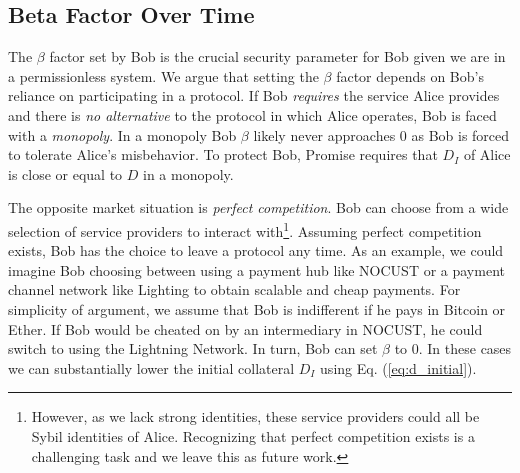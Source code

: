 \documentclass[runningheads]{llncs}
\newcommand{\sys}{Promise\xspace}
\newcommand{\aza}[1]{\todo[linecolor=blue,backgroundcolor=blue!25,bordercolor=blue,inline,caption={}]{Comment by Alexei: #1}}
\begin{document}
\subsection{Beta Factor Over Time}
The $\beta$ factor set by Bob is the crucial security parameter for Bob given we are in a permissionless system.
We argue that setting the $\beta$ factor depends on Bob's reliance on participating in a protocol.
If Bob \emph{requires} the service Alice provides and there is \emph{no alternative} to the protocol in which Alice operates, Bob is faced with a \emph{monopoly}.
In a monopoly Bob $\beta$ likely never approaches 0 as Bob is forced to tolerate Alice's misbehavior.
To protect Bob, \sys requires that $D_I$ of Alice is close or equal to $D$ in a monopoly.

The opposite market situation is \emph{perfect competition}.
Bob can choose from a wide selection of service providers to interact with\footnote{
However, as we lack strong identities, these service providers could all be Sybil identities of Alice.
Recognizing that perfect competition exists is a challenging task and we leave this as future work.}.
Assuming perfect competition exists, Bob has the choice to leave a protocol any time.
As an example, we could imagine Bob choosing between using a payment hub like NOCUST or a payment channel network like Lighting to obtain scalable and cheap payments.
For simplicity of argument, we assume that Bob is indifferent if he pays in Bitcoin or Ether.
If Bob would be cheated on by an intermediary in NOCUST, he could switch to using the Lightning Network.
In turn, Bob can set $\beta$ to 0.
In these cases we can substantially lower the initial collateral $D_I$ using Eq. (\ref{eq:d_initial}).








\end{document}
